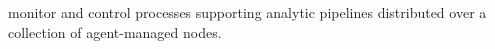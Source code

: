 \begin{description}
  \item monitor and control processes supporting analytic pipelines distributed
  over a collection of agent-managed nodes.
\end{description}